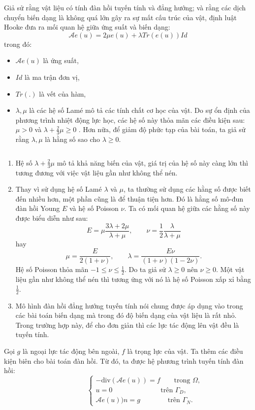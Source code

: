 \documentclass[
12pt, %
oneside, %
english, %
onehalfspacing, %
nolistspacing, %
headsepline, %
addchap,
]{MastersDoctoralThesis} %
\begin{document}
Giả sử rằng vật liệu có tính đàn hồi tuyến tính và đẳng hướng; và rằng các dịch chuyển biến dạng là không quá lớn gây ra sự mất cấu trúc của vật, định luật Hooke đưa ra mối quan hệ giữa ứng suất và biến dạng:
\begin{equation}\label{equa1}
\mathcal{A}e(u) = 2\mu e(u) + \lambda Tr(e(u))Id
\end{equation}
trong đó:
\begin{itemize}
\item $\mathcal{A}e(u)$ là ứng suất,
\item $Id$ là ma trận đơn vị,
\item $Tr(.)$ là vết của hàm,
\item $\lambda, \mu$ là các hệ số Lamé mô tả các tính chất cơ học của vật. Do sự ổn định của phương trình nhiệt động lực học, các hệ số này thỏa mãn các điều kiện sau: $\mu >0$ và $\lambda + \frac{2}{3}\mu \geq 0$ \cite{AJT04}. Hơn nữa, để giảm độ phức tạp của bài toán, ta giả sử rằng $\lambda ,\mu$ là hằng số sao cho  $\lambda \geq 0$.
\end{itemize}
\begin{rem}
$\quad$
\begin{enumerate}{}
\item Hệ số $\lambda + \frac{2}{3}\mu$ mô tả khả năng biến  của vật, giá trị của hệ số này càng lớn thì tương đương với việc vật liệu gần như không thể nén.
\item Thay vì sử dụng hệ số Lamé $\lambda$ và $\mu$, ta thường sử dụng các hằng số được biết đến nhiều hơn, một phần cũng là để thuận tiện hơn. Đó là hằng số mô-đun đàn hồi Young $E$ và hệ số Poisson $\nu$. Ta có mối quan hệ giữa các hằng số này được biểu diễn như sau:
$$E = \mu \frac{3\lambda +2\mu}{\lambda +\mu}, \qquad \nu=\frac{1}{2}\frac{\lambda}{\lambda +\mu}$$
hay
$$\mu = \frac{E}{2(1 + \nu)}, \qquad \lambda = \frac{E\nu}{(1 + \nu)(1 - 2\nu)}.$$
Hệ số Poisson thỏa mãn $-1\leq \nu\leq \frac{1}{2}$. Do ta giả sử $\lambda \geq 0$ nên $\nu\geq 0$. Một vật liệu gần như không thể nén thì tương ứng với nó là hệ số Poisson xấp xỉ bằng $\frac{1}{2}$.
\item Mô hình đàn hồi đẳng hướng tuyến tính nói chung được áp dụng vào trong các bài toán biến dạng mà trong đó độ biến dạng của vật liệu là rất nhỏ. Trong trường hợp này, để cho đơn giản thì các lực tác động lên vật đều là tuyến tính.
\end{enumerate}
\end{rem}
Gọi $g$ là ngoại lực tác động bên ngoài, $f$ là trọng lực của vật. Ta thêm các điều kiện biên cho bài toán đàn hồi. Từ đó, ta được hệ phương trình tuyến tính đàn hồi:
\begin{equation}\label{prob}
\quad\quad\quad\quad\quad
\begin{cases}
-\text{div}(\mathcal{A}e(u)) = f \qquad \text{trong } \Omega,\\
u = 0 \quad\qquad\qquad\qquad \text{trên } \Gamma_D, \\
\mathcal{A}e(u))n = g \qquad\qquad \text{trên } \Gamma_N.
\end{cases}
\end{equation}
\end{document}
